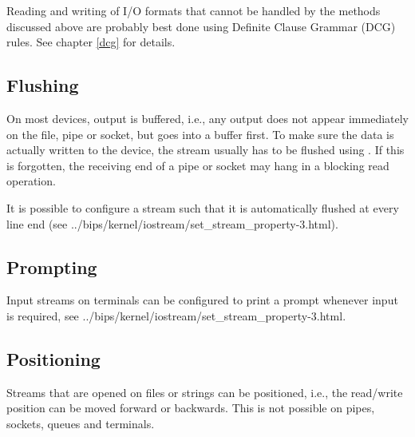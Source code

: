 Reading and writing of I/O formats that cannot be handled by the methods
discussed above are probably best done using Definite Clause Grammar
(DCG) rules. See chapter \ref{dcg} for details.


\subsection{Flushing}
On most devices, output is buffered, i.e., any output does not appear
immediately on the file, pipe or socket, but goes into a buffer first.
To make sure the data is actually written to the device, the stream
usually has to be flushed using
.
If this is forgotten, the receiving end of a pipe or socket may hang
in a blocking read operation.

It is possible to configure a stream such that it is automatically
flushed at every line end (see
%
{../bips/kernel/iostream/set_stream_property-3.html}).


\subsection{Prompting}
Input streams on terminals can be configured to print a prompt
whenever input is required, see
%
{../bips/kernel/iostream/set_stream_property-3.html}.


\subsection{Positioning}
Streams that are opened on files or strings can be positioned,
i.e., the read/write position can be moved forward or backwards.
This is not possible on pipes, sockets, queues and terminals.

